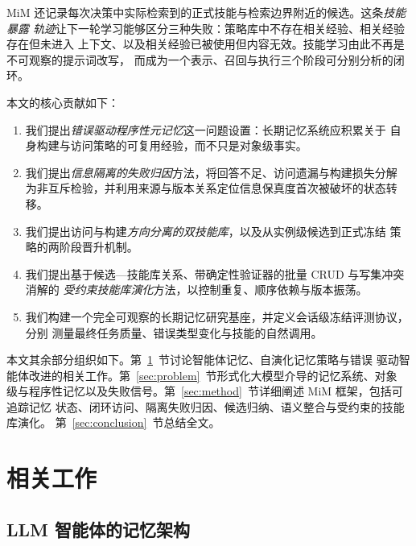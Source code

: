 \documentclass[UTF8,11pt]{ctexart}
\begin{document}
MiM 还记录每次决策中实际检索到的正式技能与检索边界附近的候选。这条\emph{技能暴露
轨迹}让下一轮学习能够区分三种失败：策略库中不存在相关经验、相关经验存在但未进入
上下文、以及相关经验已被使用但内容无效。技能学习由此不再是不可观察的提示词改写，
而成为一个表示、召回与执行三个阶段可分别分析的闭环。

本文的核心贡献如下：

\begin{enumerate}[leftmargin=*,itemsep=2pt,topsep=4pt]
  \item 我们提出\emph{错误驱动程序性元记忆}这一问题设置：长期记忆系统应积累关于
  自身构建与访问策略的可复用经验，而不只是对象级事实。
  \item 我们提出\emph{信息隔离的失败归因}方法，将回答不足、访问遗漏与构建损失分解
  为非互斥检验，并利用来源与版本关系定位信息保真度首次被破坏的状态转移。
  \item 我们提出访问与构建\emph{方向分离的双技能库}，以及从实例级候选到正式冻结
  策略的两阶段晋升机制。
  \item 我们提出基于候选—技能库关系、带确定性验证器的批量 CRUD 与写集冲突消解的
  \emph{受约束技能库演化}方法，以控制重复、顺序依赖与版本振荡。
  \item 我们构建一个完全可观察的长期记忆研究基座，并定义会话级冻结评测协议，分别
  测量最终任务质量、错误类型变化与技能的自然调用。
\end{enumerate}

本文其余部分组织如下。第~\ref{sec:related}~节讨论智能体记忆、自演化记忆策略与错误
驱动智能体改进的相关工作。第~\ref{sec:problem}~节形式化大模型介导的记忆系统、对象
级与程序性记忆以及失败信号。第~\ref{sec:method}~节详细阐述 MiM 框架，包括可追踪记忆
状态、闭环访问、隔离失败归因、候选归纳、语义整合与受约束的技能库演化。
第~\ref{sec:conclusion}~节总结全文。

\section{相关工作}
\label{sec:related}

\subsection{LLM 智能体的记忆架构}
\label{sec:rw-arch}
\end{document}
